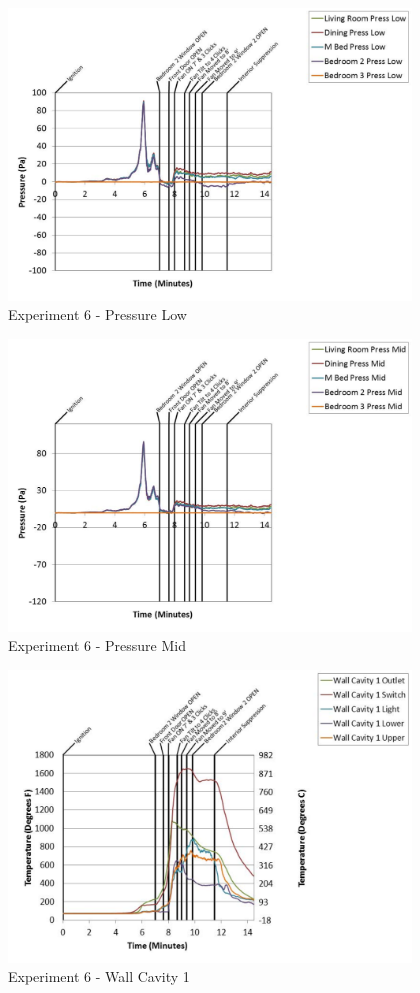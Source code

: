 \documentclass{article}
\begin{document}
\begin{appendices}
	\begin{figure}[h!]
		\centering
		\includegraphics[height=3.05in]{0_Images/Results_Charts/Exp_6_Charts/PressureLow.pdf}
		\caption{Experiment 6 - Pressure Low}
	\end{figure}
 
	\clearpage

	\begin{figure}[h!]
		\centering
		\includegraphics[height=3.05in]{0_Images/Results_Charts/Exp_6_Charts/PressureMid.pdf}
		\caption{Experiment 6 - Pressure Mid}
	\end{figure}
 

	\begin{figure}[h!]
		\centering
		\includegraphics[height=3.05in]{0_Images/Results_Charts/Exp_6_Charts/WallCavity1.pdf}
		\caption{Experiment 6 - Wall Cavity 1}
	\end{figure}
 

\end{appendices}
\end{document}
